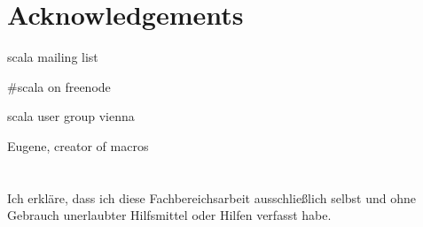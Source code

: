 \documentclass[12pt,oneside,a4paper]{scrbook}
\begin{document}
\chapter{Acknowledgements}
scala mailing list

\#scala on freenode

scala user group vienna

Eugene, creator of macros


\singlespacing

{}

\chapter*{}
\onehalfspacing
Ich erkläre, dass ich diese Fachbereichsarbeit ausschließlich selbst und ohne Gebrauch unerlaubter Hilfsmittel oder Hilfen verfasst habe.
\end{document}

